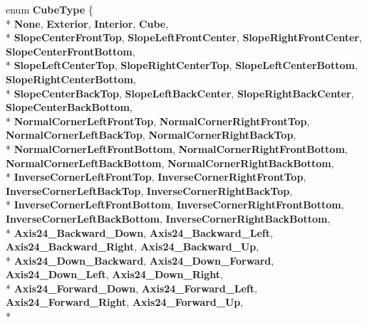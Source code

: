 \begin{DoxyCompactItemize}
\item 
\hypertarget{namespace_s_e_mod_a_p_i_1_1_interop_ab2d27839356d05fcb1cc10e2088b0b32}{}enum {\bfseries Cube\+Type} \{ \\*
{\bfseries None}, 
{\bfseries Exterior}, 
{\bfseries Interior}, 
{\bfseries Cube}, 
\\*
{\bfseries Slope\+Center\+Front\+Top}, 
{\bfseries Slope\+Left\+Front\+Center}, 
{\bfseries Slope\+Right\+Front\+Center}, 
{\bfseries Slope\+Center\+Front\+Bottom}, 
\\*
{\bfseries Slope\+Left\+Center\+Top}, 
{\bfseries Slope\+Right\+Center\+Top}, 
{\bfseries Slope\+Left\+Center\+Bottom}, 
{\bfseries Slope\+Right\+Center\+Bottom}, 
\\*
{\bfseries Slope\+Center\+Back\+Top}, 
{\bfseries Slope\+Left\+Back\+Center}, 
{\bfseries Slope\+Right\+Back\+Center}, 
{\bfseries Slope\+Center\+Back\+Bottom}, 
\\*
{\bfseries Normal\+Corner\+Left\+Front\+Top}, 
{\bfseries Normal\+Corner\+Right\+Front\+Top}, 
{\bfseries Normal\+Corner\+Left\+Back\+Top}, 
{\bfseries Normal\+Corner\+Right\+Back\+Top}, 
\\*
{\bfseries Normal\+Corner\+Left\+Front\+Bottom}, 
{\bfseries Normal\+Corner\+Right\+Front\+Bottom}, 
{\bfseries Normal\+Corner\+Left\+Back\+Bottom}, 
{\bfseries Normal\+Corner\+Right\+Back\+Bottom}, 
\\*
{\bfseries Inverse\+Corner\+Left\+Front\+Top}, 
{\bfseries Inverse\+Corner\+Right\+Front\+Top}, 
{\bfseries Inverse\+Corner\+Left\+Back\+Top}, 
{\bfseries Inverse\+Corner\+Right\+Back\+Top}, 
\\*
{\bfseries Inverse\+Corner\+Left\+Front\+Bottom}, 
{\bfseries Inverse\+Corner\+Right\+Front\+Bottom}, 
{\bfseries Inverse\+Corner\+Left\+Back\+Bottom}, 
{\bfseries Inverse\+Corner\+Right\+Back\+Bottom}, 
\\*
{\bfseries Axis24\+\_\+\+Backward\+\_\+\+Down}, 
{\bfseries Axis24\+\_\+\+Backward\+\_\+\+Left}, 
{\bfseries Axis24\+\_\+\+Backward\+\_\+\+Right}, 
{\bfseries Axis24\+\_\+\+Backward\+\_\+\+Up}, 
\\*
{\bfseries Axis24\+\_\+\+Down\+\_\+\+Backward}, 
{\bfseries Axis24\+\_\+\+Down\+\_\+\+Forward}, 
{\bfseries Axis24\+\_\+\+Down\+\_\+\+Left}, 
{\bfseries Axis24\+\_\+\+Down\+\_\+\+Right}, 
\\*
{\bfseries Axis24\+\_\+\+Forward\+\_\+\+Down}, 
{\bfseries Axis24\+\_\+\+Forward\+\_\+\+Left}, 
{\bfseries Axis24\+\_\+\+Forward\+\_\+\+Right}, 
{\bfseries Axis24\+\_\+\+Forward\+\_\+\+Up}, 
\\*

\end{DoxyCompactItemize}

